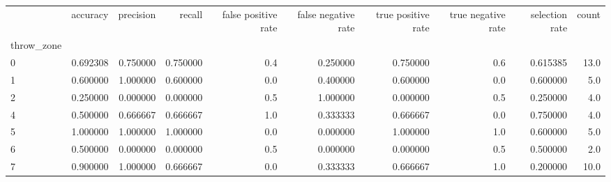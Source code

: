\begin{tabular}{lrrrrrrrrr}
\toprule
{} &  accuracy &  precision &    recall &  false positive rate &  false negative rate &  true positive rate &  true negative rate &  selection rate &  count \\
throw\_zone &           &            &           &                      &                      &                     &                     &                 &        \\
\midrule
0          &  0.692308 &   0.750000 &  0.750000 &                  0.4 &             0.250000 &            0.750000 &                 0.6 &        0.615385 &   13.0 \\
1          &  0.600000 &   1.000000 &  0.600000 &                  0.0 &             0.400000 &            0.600000 &                 0.0 &        0.600000 &    5.0 \\
2          &  0.250000 &   0.000000 &  0.000000 &                  0.5 &             1.000000 &            0.000000 &                 0.5 &        0.250000 &    4.0 \\
4          &  0.500000 &   0.666667 &  0.666667 &                  1.0 &             0.333333 &            0.666667 &                 0.0 &        0.750000 &    4.0 \\
5          &  1.000000 &   1.000000 &  1.000000 &                  0.0 &             0.000000 &            1.000000 &                 1.0 &        0.600000 &    5.0 \\
6          &  0.500000 &   0.000000 &  0.000000 &                  0.5 &             0.000000 &            0.000000 &                 0.5 &        0.500000 &    2.0 \\
7          &  0.900000 &   1.000000 &  0.666667 &                  0.0 &             0.333333 &            0.666667 &                 1.0 &        0.200000 &   10.0 \\
\bottomrule
\end{tabular}
